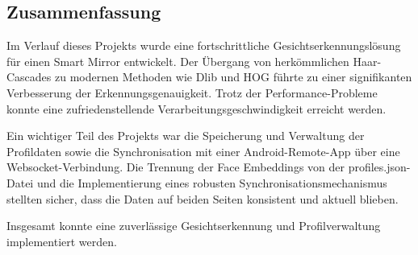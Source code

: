 \subsection{Zusammenfassung}
Im Verlauf dieses Projekts wurde eine fortschrittliche Gesichtserkennungslösung für einen Smart Mirror entwickelt. Der Übergang von herkömmlichen Haar-Cascades zu modernen Methoden wie Dlib und HOG führte zu einer signifikanten Verbesserung der Erkennungsgenauigkeit. Trotz der Performance-Probleme konnte eine zufriedenstellende Verarbeitungsgeschwindigkeit erreicht werden.

\noindent Ein wichtiger Teil des Projekts war die Speicherung und Verwaltung der Profildaten sowie die Synchronisation mit einer Android-Remote-App über eine Websocket-Verbindung. Die Trennung der Face Embeddings von der profiles.json-Datei und die Implementierung eines robusten Synchronisationsmechanismus stellten sicher, dass die Daten auf beiden Seiten konsistent und aktuell blieben.

\noindent Insgesamt konnte eine zuverlässige Gesichtserkennung und Profilverwaltung implementiert werden.
